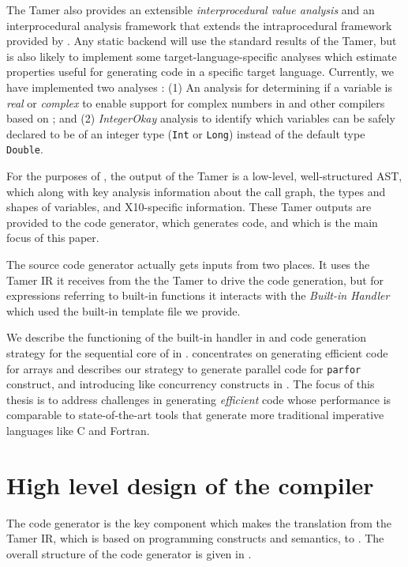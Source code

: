 The Tamer also provides an extensible \textit{interprocedural value
analysis} and an interprocedural analysis framework that extends the
intraprocedural framework provided by \mcsaf.   Any static backend will
use the standard results of the Tamer,  but is also likely to implement
some target-language-specific analyses which estimate properties useful
for generating code in a specific target language. Currently, we have
implemented two analyses : (1) An analysis for determining if a \matlab
variable is \textit{real} or \textit{complex} to enable support for
complex numbers in \mixten and other \matlab compilers based on \mclab;
and (2) \emph{IntegerOkay} analysis to identify which variables can be
safely declared to be of an integer type (\texttt{Int} or \texttt{Long})
instead of the default type \texttt{Double}.  

For the purposes of \mixten, the output of the Tamer is a low-level,
well-structured AST, which along with key analysis information about the
call graph,  the types and shapes of variables, and X10-specific
information.   These Tamer outputs are provided to the code generator,
which generates \xten code, and which is the main focus of this paper.

The \xten source code generator actually gets inputs from two places.
It uses the Tamer IR it receives from the the Tamer to drive the code
generation,  but for expressions referring to built-in \matlab functions
it interacts with the \textit{Built-in Handler} which used the built-in
template file we provide.  

We describe the functioning of the
built-in handler in  and code generation strategy for the
sequential core of \matlab in . 
concentrates on generating efficient code for \matlab arrays and
 describes our strategy to generate parallel \xten
code for \matlab \texttt{parfor} construct, and introducing \xten like
concurrency constructs in \matlab. The focus of this thesis is to address
challenges in generating \emph{efficient} \xten
code whose performance is comparable to state-of-the-art tools that
generate more traditional imperative languages like C and Fortran.

\section{High level design of the \mixten compiler}

The \mixten code generator is the key component which makes the
translation from the Tamer IR, which is based on \matlab programming
constructs and semantics,  to \xten.  The overall structure of the
\mixten code generator is given in .

